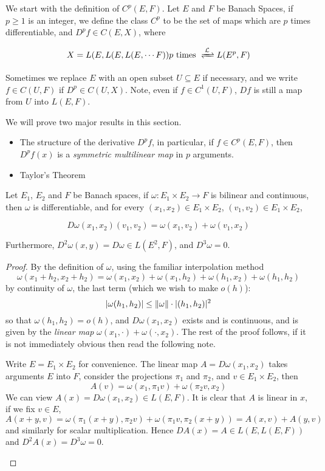 \documentclass[../main-manifolds.tex]{subfiles}
\begin{document}
\newpage
{}
We start with the definition of $C^p(E,F)$. Let $E$ and $F$ be Banach Spaces, if $p\geq 1$ is an integer, we define the class $C^p$ to be the set of maps which are $p$ times differentiable, and $D^p f\in C(E, X)$, where 

\[
    X = L(E, L(E, L(E,\cdots F))  p\text{ times }  \Isomor{L} L(E^p, F)
\]

Sometimes we replace $E$ with an open subset $U\subseteq E$ if necessary, and we write $f\in C(U,F)$ if $D^p\in C(U,X)$. Note, even if $f\in C^1(U,F)$, $Df$ is still a map from $U$ into $L(E,F)$. 

We will prove two major results in this section.

\begin{itemize}
    \item The structure of the derivative $D^p f$, in particular, if $f\in C^p(E,F)$, then $D^pf(x)$ is a \emph{symmetric multilinear map} in $p$ arguments. 
    \item Taylor's Theorem
\end{itemize}

\begin{wts}
    Let $E_1$, $E_2$ and $F$ be Banach spaces, if $\omega: E_1\times E_2\to F$ is bilinear and continuous, then $\omega$ is differentiable, and for every $(x_1, x_2)\in E_1\times E_2$, $(v_1,v_2)\in E_1\times E_2$,

    \[
        D\omega(x_1,x_2)(v_1,v_2) = \omega(x_1, v_2) + \omega(v_1, x_2)
    \]

    Furthermore, $D^2\omega(x,y) = D\omega\in L(E^2,F)$, and $D^3\omega = 0$.
    
\end{wts}
\begin{proof}
    By the definition of $\omega$, using the familiar interpolation method
    \[
        \omega(x_1 + h_2, x_2 + h_2) = \omega(x_1, x_2)  + \omega(x_1, h_2) + \omega(h_1, x_2) + \omega(h_1, h_2)
    \]
    by continuity of $\omega$, the last term (which we wish to make $o(h)$): 
    \[
    \vert \omega(h_1, h_2)\vert\leq \norm{\omega}\cdot\vert (h_1, h_2)\vert^2
    \]
    so that $\omega(h_1, h_2) = o(h)$, and $D\omega(x_1, x_2)$ exists and is continuous, and is given by the \emph{linear map} $\omega(x_1, \cdot) + \omega(\cdot, x_2)$. The rest of the proof follows, if it is not immediately obvious then read the following note.
    \begin{note}
        Write $E = E_1\times E_2$ for convenience. The linear map $A = D\omega(x_1, x_2)$ takes arguments $E$ into $F$, consider the projections $\pi_1$ and $\pi_2$, and $v\in E_1\times E_2$, then
        \[A(v) = \omega(x_1, \pi_1 v) + \omega(\pi_2 v, x_2)\]
        We can view $A(x) = D\omega(x_1, x_2)\in L(E,F)$. It is clear that $A$ is linear in $x$, if we fix $v\in E$, 
        \[
            A(x+y, v) = \omega(\pi_1(x+y), \pi_2 v) + \omega(\pi_1 v, \pi_2 (x+y)) = A(x,v) + A(y,v)
        \]
        and similarly for scalar multiplication. Hence $DA(x) = A\in L(E, L(E,F))$ and $D^2A(x) = D^3\omega = 0$.
    \end{note}
\end{proof}
\end{document}
